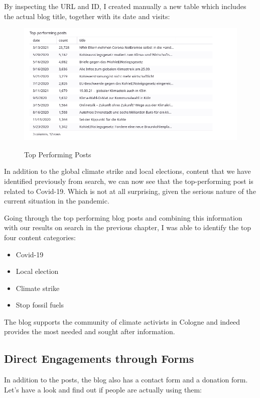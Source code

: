 By inspecting the URL and ID, I created manually a new table which includes the actual blog title, together with its date and visits:

\begin{figure}[H]
\centering
\caption {Top Performing Posts}
\includegraphics[width=\linewidth]{images/figure13.png}
\label{fig:manualReview}
\end{figure}

In addition to the global climate strike and local elections, content that we have identified previously from search, we can now see that the top-performing post is related to Covid-19. Which is not at all surprising, given the serious nature of the current situation in the pandemic.

Going through the top performing blog posts and combining this information with our results on search in the previous chapter, I was able to identify the top four content categories:

\begin{itemize}
 \item Covid-19
 \item Local election
 \item Climate strike
 \item Stop fossil fuels
\end{itemize}

The blog supports the community of climate activists in Cologne and indeed provides the most needed and sought after information.

\subsection{Direct Engagements through Forms}

In addition to the posts, the blog also has a contact form and a donation form. Let's have a look and find out if people are actually using them:

